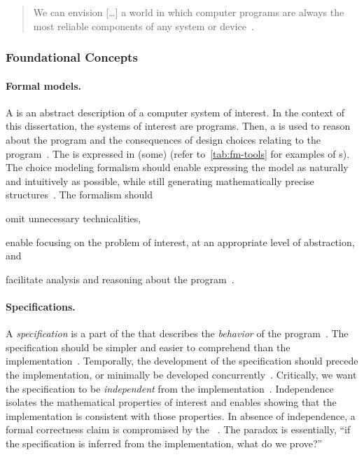 \begin{quotation}
\noindent{}We can envision [\ldots] a world in which computer programs are
always the most reliable components of any system or device~\cite{hoare2021}.
\end{quotation}

\subsubsection{Foundational Concepts}
\label{subsubsec:verification-concepts}

\paragraph*{Formal models.}
A  is an abstract description of a computer system of
interest. In the context of this dissertation, the systems of interest are
programs. Then, a  is used to reason about the program and the
consequences of design choices relating to the
program~\cite{zave2023,olveczky2017}. The  is expressed in
(some)  (refer to~\autoref{tab:fm-tools} for examples of
s). The choice modeling formalism should enable
expressing the model as naturally and intuitively as possible, while still
generating mathematically precise structures~\cite{olveczky2017,beek2024}. The
formalism should
\begin{enumerate*}[label=(\roman*)]
\item omit unnecessary technicalities,
\item enable focusing on the problem of interest, at an appropriate level of
abstraction, and
\item facilitate analysis and reasoning about the program~\cite{olveczky2017}.
\end{enumerate*}

\paragraph*{Specifications.}
A \emph{specification} is a part of the  that describes the
\emph{behavior} of the program~\cite{zave2023b}. The specification should be
simpler and easier to comprehend than the implementation~\cite{zave2023b}.
Temporally, the development of the specification should precede the
implementation, or minimally be developed concurrently~\cite{dijkstra1972}.
Critically, we want the specification to be
\emph{independent} from the implementation~\cite{furia2014b}. Independence
isolates the mathematical properties of interest and enables showing that the
implementation is consistent with those properties. In absence of independence,
a formal correctness claim is compromised by the \emph{}~\cite{furia2014b}. The paradox is essentially, \enquote{if the
specification is inferred from the implementation, what do we prove?}

